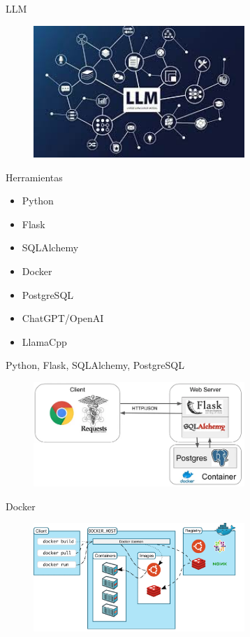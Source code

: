 \documentclass[aspectratio=169,xcolor=dvipsnames, t]{beamer}
\begin{document}
\begin{frame}{LLM}
\begin{figure}
\includegraphics[width=8cm]{style_data/img/llm.jpg}
\centering
\end{figure}
\end{frame}

\begin{frame}{Herramientas}
    \begin{itemize}
        \item Python
        \item Flask
        \item SQLAlchemy
        \item Docker
        \item PostgreSQL
        \item ChatGPT/OpenAI
        \item LlamaCpp
    \end{itemize}
\end{frame}

\begin{frame}{Python, Flask, SQLAlchemy, PostgreSQL}
\begin{figure}
\includegraphics[width=8cm]{style_data/img/python_flask.png}
\centering
\end{figure}
\end{frame}

\begin{frame}{Docker}
\begin{figure}
\includegraphics[width=8cm]{style_data/img/ArquiteturaDocker.png}
\centering
\end{figure}
\end{frame}
\end{document}

